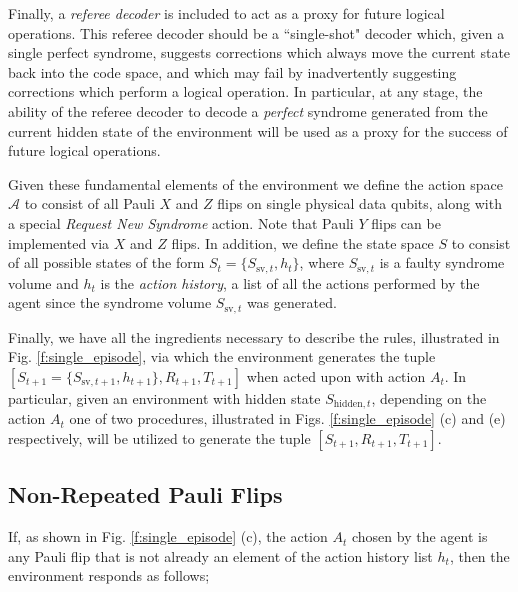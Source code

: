 \documentclass[twocolumn,preprintnumbers,amsmath,amssymb,notitlepage,nofootinbib,longbibliography,superscriptaddress,aps,pra,10pt]{revtex4-1}
\begin{document}
	Finally, a \emph{referee decoder} is included to act as a proxy for future logical operations.
	This referee decoder should be a ``single-shot" decoder which, given a single perfect syndrome, suggests corrections which always move the current state back into the code space, and which may fail by inadvertently suggesting corrections which perform a logical operation.
	In particular, at any stage, the ability of the referee decoder to decode a \emph{perfect} syndrome generated from the current hidden state of the environment will be used as a proxy for the success of future logical operations.

	Given these fundamental elements of the environment we define the action space $\mathcal{A}$ to consist of all Pauli $X$ and $Z$ flips on single physical data qubits, along with a special \emph{Request New Syndrome} action.
	Note that Pauli $Y$ flips can be implemented via $X$ and $Z$ flips.
	In addition, we define the state space $S$ to consist of all possible states of the form $S_{t} = \{S_{\mathrm{sv},t},h_t\}$, where $S_{\mathrm{sv},t}$ is a faulty syndrome volume and $h_t$ is the \emph{action history}, a list of all the actions performed by the agent since the syndrome volume $S_{\mathrm{sv},t}$ was generated.

	Finally, we have all the ingredients necessary to describe the rules, illustrated in Fig. \ref{f:single_episode}, via which the environment generates the tuple $[S_{t+1} = \{S_{\mathrm{sv},t+1},h_{t+1}\},R_{t+1},T_{t+1}]$ when acted upon with action $A_t$.
	In particular, given an environment with hidden state $S_{\mathrm{hidden},t}$, depending on the action $A_t$ one of two procedures, illustrated in Figs. \ref{f:single_episode} (c) and (e) respectively, will be utilized to generate the tuple $[S_{t+1},R_{t+1},T_{t+1}]$.

	\subsection{Non-Repeated Pauli Flips}\label{s:non-repeated}

	If, as shown in Fi{}g. \ref{f:single_episode} (c), the action $A_t$ chosen by the agent is any Pauli flip that is not already an element of the action history list $h_t$, then the environment responds as follows;
\end{document}
